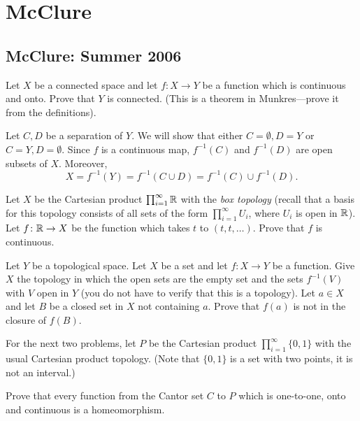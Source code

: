 \section{McClure}
\subsection{McClure: Summer 2006}
\setcounter{exercise}{0}
\setcounter{equation}{0}

\begin{problem}
  Let $X$ be a connected space and let $f\colon X\to Y$ be a function which
  is continuous and onto. Prove that $Y$ is connected. (This is a theorem
  in Munkres---prove it from the definitions).
\end{problem}
\begin{solution}
  Let $C,D$ be a separation of $Y$. We will show that either
  $C=\emptyset,D=Y$ or $C=Y,D=\emptyset$. Since $f$ is a continuous map,
  $f^{-1}(C)$ and $f^{-1}(D)$ are open subsets of $X$. Moreover,
  \[
    X=f^{-1}(Y)=f^{-1}(C\cup D)=f^{-1}(C)\cup f^{-1}(D).
  \]
\end{solution}

\begin{problem}
  Let $X$ be the Cartesian product $\prod_{i=1}^\infty\mathbb{R}$ with the
  \emph{box topology} (recall that a basis for this topology consists of
  all sets of the form $\prod_{i=1}^\infty U_i$, where $U_i$ is open in
  $\mathbb{R}$). Let $f\colon\mathbb{R}\to X$ be the function which takes $t$ to
  $(t,t,\ldots)$. Prove that $f$ is continuous.
\end{problem}
\begin{solution}
\end{solution}

\begin{problem}
  Let $Y$ be a topological space. Let $X$ be a set and let $f\colon X\to Y$
  be a function. Give $X$ the topology in which the open sets are the empty
  set and the sets $f^{-1}(V)$ with $V$ open in $Y$ (you do not have to
  verify that this is a topology). Let $a\in X$ and let $B$ be a closed set
  in $X$ not containing $a$. Prove that $f(a)$ is not in the closure of
  $f(B)$.
\end{problem}
\begin{solution}
\end{solution}

For the next two problems, let $P$ be the Cartesian product
$\prod_{i=1}^\infty\{0,1\}$ with the usual Cartesian product
topology. (Note that $\{0,1\}$ is a set with two points, it is not an
interval.)
\begin{problem}
  Prove that every function from the Cantor set $C$ to $P$ which is
  one-to-one, onto and continuous is a homeomorphism.
\end{problem}
\begin{solution}
\end{solution}

